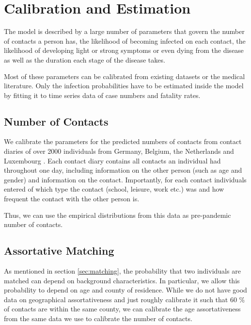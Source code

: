 \section{Calibration and Estimation}
\label{sec:calibration_and_estimation}

The model is described by a large number of parameters that govern the number of contacts a person has, the likelihood of becoming infected on each contact, the likelihood of developing light or strong symptoms or even dying from the disease as well as the duration each stage of the disease takes.

Most of these parameters can be calibrated from existing datasets or the medical literature. Only the infection probabilities have to be estimated inside the model by fitting it to time series data of case numbers and fatality rates.





\subsection{Number of Contacts}

We calibrate the parameters for the predicted numbers of contacts from contact diaries of over 2000 individuals from Germany, Belgium, the Netherlands and Luxembourg \citep{Mossong2008}. Each contact diary contains all contacts an individual had throughout one day, including information on the other person (such as age and gender) and information on the contact. Importantly, for each contact individuals entered of which type the contact (school, leisure, work etc.) was and how frequent the contact with the other person is.

Thus, we can use the empirical distributions from this data as pre-pandemic number of contacts.


\subsection{Assortative Matching}

As mentioned in section \ref{sec:matching}, the probability that two individuals are matched can depend on background characteristics. In particular, we allow this probability to depend on age and county of residence. While we do not have good data on geographical assortativeness and just roughly calibrate it such that 60 \% of contacts are within the same county\footnotemark, we can calibrate the age assortativeness from the same data we use to calibrate the number of contacts.


